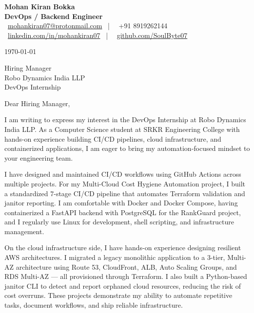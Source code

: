 \documentclass[10pt, letterpaper]{article}
\begin{document}
\pagestyle{empty}

\begin{center}
    {\LARGE \textbf{Mohan Kiran Bokka}} \\
    \vspace{2pt}
    {\large \textbf{DevOps / Backend Engineer}} \\
    \faEnvelope\ \href{mailto:mohankiran07@protonmail.com}{mohankiran07@protonmail.com} \ | \ \faPhone\ +91 8919262144 \\
    \faLinkedin\ \href{https://linkedin.com/in/mohankiran07}{linkedin.com/in/mohankiran07} \ | \ \faGithub\ \href{https://github.com/SoulByte07}{github.com/SoulByte07}
\end{center}

\vspace{10pt}

\noindent \today

\vspace{6pt}

\noindent Hiring Manager \\
Robo Dynamics India LLP \\
DevOps Internship

\vspace{6pt}

\noindent Dear Hiring Manager,

\vspace{4pt}

\noindent I am writing to express my interest in the DevOps Internship at Robo Dynamics India LLP. As a Computer Science student at SRKR Engineering College with hands-on experience building CI/CD pipelines, cloud infrastructure, and containerized applications, I am eager to bring my automation-focused mindset to your engineering team.

\vspace{4pt}

\noindent I have designed and maintained CI/CD workflows using GitHub Actions across multiple projects. For my Multi-Cloud Cost Hygiene Automation project, I built a standardized 7-stage CI/CD pipeline that automates Terraform validation and janitor reporting. I am comfortable with Docker and Docker Compose, having containerized a FastAPI backend with PostgreSQL for the RankGuard project, and I regularly use Linux for development, shell scripting, and infrastructure management.

\vspace{4pt}

\noindent On the cloud infrastructure side, I have hands-on experience designing resilient AWS architectures. I migrated a legacy monolithic application to a 3-tier, Multi-AZ architecture using Route 53, CloudFront, ALB, Auto Scaling Groups, and RDS Multi-AZ — all provisioned through Terraform. I also built a Python-based janitor CLI to detect and report orphaned cloud resources, reducing the risk of cost overruns. These projects demonstrate my ability to automate repetitive tasks, document workflows, and ship reliable infrastructure.
\end{document}
